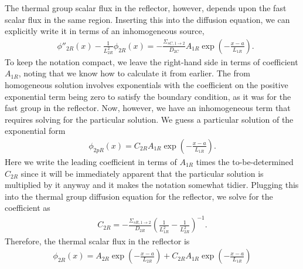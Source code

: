 The thermal group scalar flux in the reflector, however, depends upon the fast scalar flux in the same region. Inserting this into the diffusion equation, we can explicitly write it in terms of an inhomogeneous source,
\begin{align}
  &\phi''_{2R}(x) - \frac{1}{L_{2R}^2} \phi_{2R}(x) = -\frac{\Sigma_{sC,1 \rightarrow 2}}{D_{2C}}  A_{1R} \exp \left(-\frac{x-a}{L_{1R}} \right).
\end{align}
To keep the notation compact, we leave the right-hand side in terms of coefficient $A_{1R}$, noting that we know how to calculate it from earlier. The from homogeneous solution involves exponentials with the coefficient on the positive exponential term being zero to satisfy the boundary condition, as it was for the fast group in the reflector. Now, however, we have an inhomogeneous term that requires solving for the particular solution. We guess a particular solution of the exponential form
\begin{align}
  \phi_{2pR}(x) = C_{2R} A_{1R} \exp \left(-\frac{x-a}{L_{1R}} \right) .
\end{align}
Here we write the leading coefficient in terms of $A_{1R}$ times the to-be-determined $C_{2R}$ since it will be immediately apparent that the particular solution is multiplied by it anyway and it makes the notation somewhat tidier. Plugging this into the thermal group diffusion equation for the reflector, we solve for the coefficient as
\begin{align}
  C_{2R} = -\frac{\Sigma_{sR,1 \rightarrow 2}}{D_{2R}} \left( \frac{1}{L_{1R}^2} - \frac{1}{L_{2R}^2} \right)^{-1} .
\end{align} 
Therefore, the thermal scalar flux in the reflector is
\begin{align}
  \phi_{2R}(x) = A_{2R} \exp \left(-\frac{x-a}{L_{2R}} \right) + C_{2R} A_{1R} \exp \left(-\frac{x-a}{L_{1R}} \right)
\end{align}

